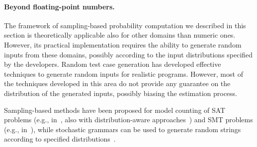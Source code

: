 \paragraph{Beyond floating-point numbers.}
The framework of sampling-based probability computation we described in this section is theoretically applicable also for other domains than numeric ones. However, its practical implementation requires the ability to generate random inputs from these domains, possibly according to the input distributions specified by the developers. Random test case generation has developed effective techniques to generate random inputs for realistic programs. However, most of the techniques developed in this area do not provide any guarantee on the distribution of the generated inputs, possibly biasing the estimation process. 

Sampling-based methods have been proposed for model counting of SAT problems (e.g., in~\cite{satCounting01,biere2009handbook,journalscorrMeel14}, also with distribution-aware approaches~\cite{chakraborty2014distribution}) and SMT problems (e.g., in~\cite{countingSMT}), while stochastic grammars can be used to generate random strings according to specified distributions~\cite{stochasticGrammars}.



